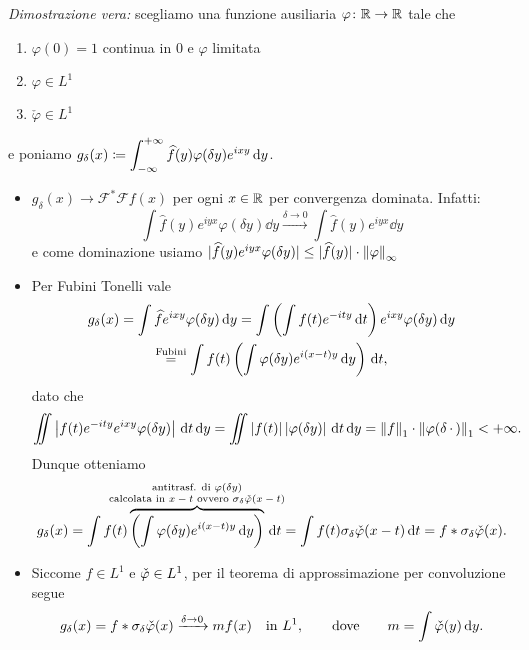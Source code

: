 \textit{Dimostrazione vera:} scegliamo una funzione ausiliaria $\varphi \colon \mathbb R \to \mathbb R$ tale che
\begin{enumerate}
	\item $\varphi(0) = 1$ continua in $0$ e $\varphi$ limitata
	\item $\varphi \in L^1$
	\item $\check\varphi \in L^1$
\end{enumerate}
e poniamo $g_\delta(x) \coloneqq \displaystyle \int_{-\infty}^{+\infty} \widehat f(y) \varphi(\delta y) e^{ixy} \,\mathrm{d} y$.
\begin{itemize}
	\item {}
		$g_\delta(x) \to \mathcal F^* \mathcal F f(x)$ per ogni $x \in \mathbb R$ per convergenza dominata. Infatti:
		$$
			\int \hat f(y) e^{iyx} \varphi(\delta y) \dd y \xrightarrow{\delta \to 0} 
			\int \hat f(y) e^{iyx} \dd y
		$$
		e come dominazione usiamo $|\widehat f(y) e^{iyx} \varphi(\delta y)| \leq |\widehat f(y)| \cdot \left\lVert \varphi \right\rVert_\infty$

	\item {} Per Fubini Tonelli vale 
		\begin{multline*}
			g_\delta(x) = \int \widehat{f} e^{ixy} \varphi(\delta y) \,\mathrm{d} y = \int \left( \int f(t) e^{-ity} \,\mathrm{d} t \right) e^{ixy} \varphi(\delta y) \,\mathrm{d} y \\
			\overset{\text{Fubini}}{=} \int f(t) \left( \int \varphi(\delta y) e^{i(x-t)y} \,\mathrm{d} y \right) \,\mathrm{d} t,
		\end{multline*}
		dato che
		$$
			\iint \left| f(t) e^{-ity} e^{ixy} \varphi(\delta y) \right| \,\mathrm{d} t \,\mathrm{d} y
			= \iint \left| f(t) \right| \left| \varphi(\delta y) \right| \,\mathrm{d} t \,\mathrm{d} y
			= \left\lVert f \right\rVert_1 \cdot \left\lVert \varphi(\delta \,\cdot\,) \right\rVert_1 < +\infty.
		$$
		Dunque otteniamo
		$$
			g_\delta(x) = \int f(t) \overbrace{\left( \int \myphi(\delta y) e^{i(x-t)y} \dd y \right)}^{\mathclap{\substack{\text{antitrasf. di $\myphi(\delta y)$} \\ \text{calcolata in $x-t$ ovvero $\sigma_\delta \check{\myphi}(x-t)$}}}} \dd t
			= \int f(t) \sigma_\delta \check{\myphi}(x-t) \dd t = f \ast \sigma_\delta \check{\myphi}(x).
		$$

	\item {} Siccome $f \in L^1$ e $\check {\varphi} \in L^1$, per il teorema di approssimazione per convoluzione segue
	$$
		g_\delta (x) = f \ast \sigma_\delta \check {\varphi}(x) \xrightarrow{\delta \to 0} mf(x) \quad \text{in } L^1, \qquad \text{dove} \qquad  m = \int \check {\varphi}(y) \,\mathrm{d} y.
	$$
	

\end{itemize}
